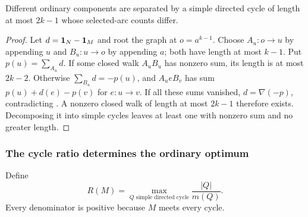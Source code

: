 \begin{lemma}\label{lem:short-separation}
Different ordinary components are separated by a simple directed
cycle of length at most $2k-1$ whose selected-arc counts differ.
\end{lemma}
\begin{proof}
Let $d=\mathbf 1_N-\mathbf 1_M$ and root the graph at $o=a^{k-1}$.
Choose $A_u:o\to u$ by appending $u$ and $B_u:u\to o$ by
appending $a$; both have length at most $k-1$. Put
$p(u)=\sum_{A_u}d$. If some closed walk $A_uB_u$ has nonzero
sum, its length is at most $2k-2$. Otherwise
$\sum_{B_u}d=-p(u)$, and $A_ueB_v$ has sum
$p(u)+d(e)-p(v)$ for $e:u\to v$. If all these sums vanished,
$d=\nabla(-p)$, contradicting .
A nonzero closed walk of length at most $2k-1$ therefore exists.
Decomposing it into simple cycles leaves at least one with
nonzero sum and no greater length.
\end{proof}

\subsubsection{The cycle ratio determines the ordinary optimum}
Define
\[
 R(M)=\max_{Q\text{ simple directed cycle}}\frac{|Q|}{m(Q)}.
\]
Every denominator is positive because $M$ meets every cycle.

